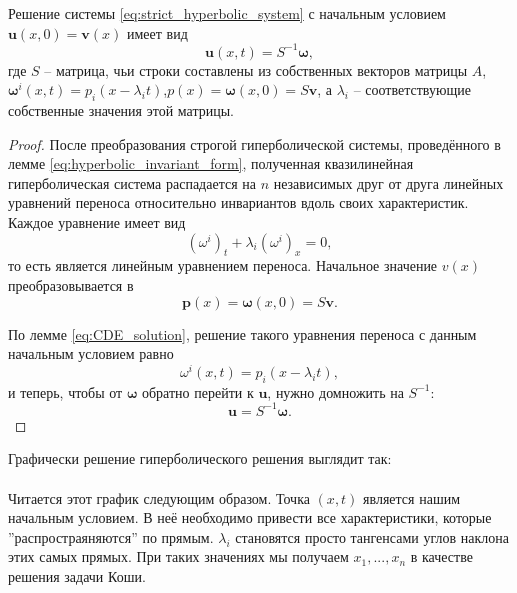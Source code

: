 \documentclass{article}
\begin{document}
\begin{theorem}
	Решение системы \eqref{eq:strict_hyperbolic_system} с начальным условием
	$\boldsymbol u(x,0)=\boldsymbol{v}(x)$ имеет вид
	\[\boldsymbol u(x,t)=S^{-1}\boldsymbol\omega,\]
	где $S$ -- матрица, чьи строки составлены из собственных векторов
	матрицы $A$, $\boldsymbol\omega^i(x,t)=p_i(x-\lambda_i t)$,\quad $p(x)=
	\boldsymbol\omega(x,0)=S\boldsymbol v$, а $\lambda_i$ --
	соответствующие собственные значения этой матрицы.
\end{theorem}

\begin{proof}
	После преобразования строгой гиперболической системы, проведённого в
	лемме \eqref{eq:hyperbolic_invariant_form}, полученная квазилинейная
	гиперболическая система распадается на $n$ независимых друг от друга
	линейных уравнений переноса относительно инвариантов вдоль своих
	характеристик. Каждое уравнение имеет вид
	\[(\omega^i)_t+\lambda_i(\omega^i)_x=0,\]
	то есть является линейным уравнением переноса. Начальное значение $v(x)$
	преобразовывается в
	\[\boldsymbol p(x)=\boldsymbol\omega(x,0)=S\boldsymbol v.\]

	По лемме \eqref{eq:CDE_solution}, решение такого уравнения переноса
	с данным начальным условием равно
	\[\omega^i(x,t)=p_i(x-\lambda_i t),\]
	и теперь, чтобы от $\boldsymbol\omega$ обратно перейти к
	$\boldsymbol u$, нужно домножить на $S^{-1}$:
	\[\boldsymbol u=S^{-1}\boldsymbol\omega.\]
\end{proof}

Графически решение гиперболического решения выглядит так: \\

 \\

Читается этот график следующим образом. Точка $(x,t)$ является нашим начальным
условием. В неё необходимо привести все характеристики, которые
''распростраяняются'' по прямым. $\lambda_i$ становятся просто тангенсами
углов наклона этих самых прямых. При таких значениях мы получаем $x_1,...,x_n$
в качестве решения задачи Коши.
\end{document}
